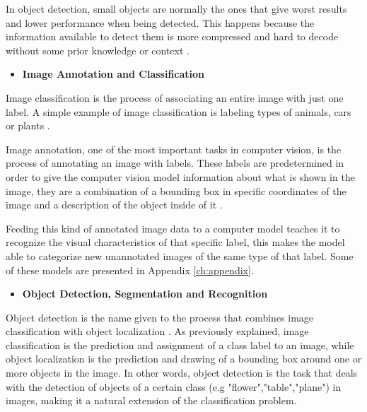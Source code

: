     \par In object detection, small objects are normally the ones that give  worst results and lower performance when being detected. This happens because the information available to detect them is more compressed and hard to decode without some prior knowledge or context \cite{Agarwal2019}.


\begin{itemize}
    \item \textbf{Image Annotation and Classification}
\end{itemize}

    Image classification is the process of associating an entire image with just one label. A simple example of image classification is labeling types of animals, cars or plants \cite{Feng2019}. \par
    Image annotation, one of the most important tasks in computer vision, is the process of annotating an image with labels. These labels are predetermined in order to give the computer vision model information about what is shown in the image, they are a combination of a bounding box in specific coordinates of the image  and a description of the object inside of it \cite{annotation}. \par

    Feeding this kind of annotated image data to a computer model teaches it to recognize the visual characteristics of that specific label, this makes the model able to categorize new unannotated images of the same type of that label. Some of these models are presented in Appendix \ref{ch:appendix}.

    \begin{itemize}
        \item \textbf{Object Detection, Segmentation and Recognition}
    \end{itemize}
    

    \par Object detection is the name given to the process that combines image classification with object localization \cite{ObjectDetection}. As previously explained, image classification is the prediction and assignment of a class label to an image, while object localization is the prediction and drawing of a bounding box around one or more objects in the image. In other words, object detection is the task that deals with the detection of objects of a certain class (e.g "flower","table","plane") in images, making it a natural extension of the classification problem. 

